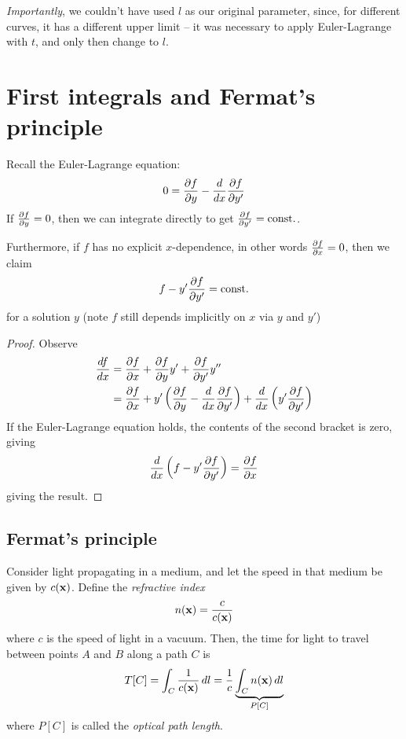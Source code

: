 \documentclass{../../template/note}
\begin{document}
\begin{enumerate}[label=\protect\circled{\arabic*}]
        \emph{Importantly}, we couldn't have used $l$ as our original parameter, since, for different curves, it has a different upper limit -- it was necessary to apply Euler-Lagrange with $t$, and only then change to $l$.
    \end{enumerate}
    
    \section{First integrals and Fermat's principle}

    Recall the Euler-Lagrange equation:
    \begin{align*}
        0 = \pd{f}{y} - \frac{d}{dx} \pd{f}{y'}
    \end{align*}
    If $\pd{f}{y} = 0$, then we can integrate directly to get $\pd{f}{y'} = \text{const.}$.
    
    \begin{lemma}
        Furthermore, if $f$ has no explicit $x$-dependence, in other words $\pd{f}{x} = 0$, then we claim
        \begin{align*}
            f - y'\pd{f}{y'} = \text{const.}
        \end{align*}
        for a solution $y$ (note $f$ still depends implicitly on $x$ via $y$ and $y'$)        
    \end{lemma}
    
    \begin{proof}
        Observe
        \begin{align*}
            \frac{df}{dx} &= \pd{f}{x} + \pd{f}{y}y' + \pd{f}{y'}y'' \\
            &= \pd{f}{x} + y' \left(\pd{f}{y} - \frac{d}{dx} \pd{f}{y'}\right) + \frac{d}{dx} \left(y' \pd{f}{y'}\right)
        \end{align*}
        If the Euler-Lagrange equation holds, the contents of the second bracket is zero, giving
        \begin{align*}
            \frac{d}{dx}\left(f-y'\pd{f}{y'}\right) = \pd{f}{x}
        \end{align*}
        giving the result.       
    \end{proof}
    
    \subsection{Fermat's principle}

    Consider light propagating in a medium, and let the speed in that medium be given by $c(\V x)$. Define the \emph{refractive index}
    \begin{align*}
        n(\V x) = \frac c {c(\V x)}
    \end{align*}
    where $c$ is the speed of light in a vacuum. Then, the time for light to travel between points $A$ and $B$ along a path $C$ is
    \begin{align*}
        T[C] = \int_C \frac{1}{c(\V x)} \D l = \frac{1}{c} \underbrace{\int_C n(\V x) \D l}_{P[C]}
    \end{align*}
    where $P[C]$ is called the \emph{optical path length}.
\end{document}
